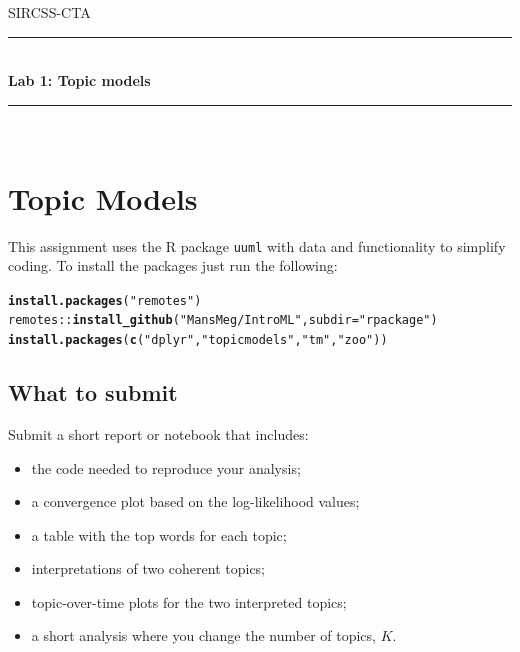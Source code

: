 \documentclass[11pt,a4paper,english]{article}\usepackage[]{graphicx}\usepackage[]{xcolor}
\makeatletter
\newcommand{\hlsng}[1]{\textcolor[rgb]{0.192,0.494,0.8}{#1}}%
\newcommand{\hlopt}[1]{\textcolor[rgb]{0,0,0}{#1}}%
\newcommand{\hldef}[1]{\textcolor[rgb]{0.345,0.345,0.345}{#1}}%
\newcommand{\hlkwc}[1]{\textcolor[rgb]{0.333,0.667,0.333}{#1}}%
\newcommand{\hlkwd}[1]{\textcolor[rgb]{0.737,0.353,0.396}{\textbf{#1}}}%
\newenvironment{kframe}{%
 \def\at@end@of@kframe{}%
 \ifinner\ifhmode%
  \def\at@end@of@kframe{\end{minipage}}%
  \begin{minipage}{\columnwidth}%
 \fi\fi%
 \def\FrameCommand##1{\hskip\@totalleftmargin \hskip-\fboxsep
 \colorbox{shadecolor}{##1}\hskip-\fboxsep
     \hskip-\linewidth \hskip-\@totalleftmargin \hskip\columnwidth}%
 \MakeFramed {\advance\hsize-\width
   \@totalleftmargin\z@ \linewidth\hsize
   \@setminipage}}%
 {\par\unskip\endMakeFramed%
 \at@end@of@kframe}
\newenvironment{knitrout}{}{} %
\newcommand{\HRule}{\rule{\linewidth}{0.5mm}}
\makeatother
\begin{document}

\hypersetup{pageanchor=false}
\begin{titlepage}

\center
\textsc{\LARGE SIRCSS-CTA}\\[1.5cm] %

\HRule \\[0.4cm]
{ \huge \bfseries Lab 1: Topic models}\\[0.4cm] %
\HRule \\[1.5cm]

\vfill

\end{titlepage}
\hypersetup{pageanchor=true}
\pagestyle{plain}
\setcounter{page}{1}





\section{Topic Models}

This assignment uses the R package \texttt{uuml} with data and functionality to simplify coding. To install the packages just run the following:
\begin{knitrout}\small
{}\color{fgcolor}\begin{kframe}
\begin{alltt}
\hlkwd{install.packages}\hldef{(}\hlsng{"remotes"}\hldef{)}
\hldef{remotes}\hlopt{::}\hlkwd{install_github}\hldef{(}\hlsng{"MansMeg/IntroML"}\hldef{,} \hlkwc{subdir} \hldef{=} \hlsng{"rpackage"}\hldef{)}
\hlkwd{install.packages}\hldef{(}\hlkwd{c}\hldef{(}\hlsng{"dplyr"}\hldef{,} \hlsng{"topicmodels"}\hldef{,} \hlsng{"tm"}\hldef{,} \hlsng{"zoo"}\hldef{))}
\end{alltt}
\end{kframe}
\end{knitrout}

\subsection*{What to submit}

Submit a short report or notebook that includes:
\begin{itemize}
\item the code needed to reproduce your analysis;
\item a convergence plot based on the log-likelihood values;
\item a table with the top words for each topic;
\item interpretations of two coherent topics;
\item topic-over-time plots for the two interpreted topics;
\item a short analysis where you change the number of topics, $K$.
\end{itemize}
\end{document}
